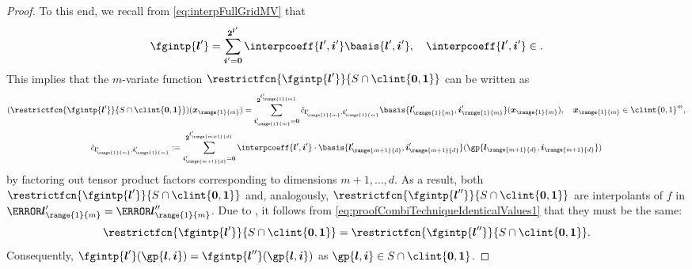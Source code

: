 \begin{proof}
  To this end, we recall from \eqref{eq:interpFullGridMV} that
  \begin{equation}
    \fgintp{\*l'}
    = \sum_{\*i'=\*0}^{\*2^{\*l'}} \interpcoeff{\*l',\*i'}
    \basis{\*l',\*i'},\quad
    \interpcoeff{\*l',\*i'} \in \real.
  \end{equation}
  This implies that the $m$-variate function
  $\restrictfcn{\fgintp{\*l'}}{S \cap \clint{\*0, \*1}}$ can be written as
  \begin{subequations}
    \begin{gather}
      (\restrictfcn{\fgintp{\*l'}}{S \cap \clint{\*0, \*1}})(\*x_{\range{1}{m}})
      = \sum_{\*i'_{\range{1}{m}}=\*0}^{\*2^{\*l'_{\range{1}{m}}}}
      \interpcoefftilde{\*l'_{\range{1}{m}},\*i'_{\range{1}{m}}}
      \basis{\*l'_{\range{1}{m}},\*i'_{\range{1}{m}}}(\*x_{\range{1}{m}}),\quad
      \*x_{\range{1}{m}} \in \clint{0, 1}^m,\\
      \interpcoefftilde{\*l'_{\range{1}{m}},\*i'_{\range{1}{m}}}
      := \sum_{\*i'_{\range{m+1}{d}}=\*0}^{\*2^{\*l'_{\range{m+1}{d}}}}
      \interpcoeff{\*l',\*i'} \cdot
      \basis{\*l'_{\range{m+1}{d}},\*i'_{\range{m+1}{d}}}%
      (\gp{\*l_{\range{m+1}{d}},\*i_{\range{m+1}{d}}})
    \end{gather}
  \end{subequations}
  by factoring out tensor product factors corresponding to dimensions
  $m + 1, \dotsc, d$.
  As a result,
  both $\restrictfcn{\fgintp{\*l'}}{S \cap \clint{\*0, \*1}}$
  and, analogously,
  $\restrictfcn{\fgintp{\*l''}}{S \cap \clint{\*0, \*1}}$
  are interpolants of $f$ in
  $\ns{\*l'_{\range{1}{m}}} = \ns{\*l''_{\range{1}{m}}}$.
  Due to ,
  it follows from \eqref{eq:proofCombiTechniqueIdenticalValues1}
  that they must be the same:
  \begin{equation}
    \restrictfcn{\fgintp{\*l'}}{S \cap \clint{\*0, \*1}}
    = \restrictfcn{\fgintp{\*l''}}{S \cap \clint{\*0, \*1}}.
  \end{equation}
  Consequently, $\fgintp{\*l'}(\gp{\*l,\*i}) = \fgintp{\*l''}(\gp{\*l,\*i})$
  as $\gp{\*l,\*i} \in S \cap \clint{\*0, \*1}$.
\end{proof}

\lemmaCombiTechniqueCharacterization*

